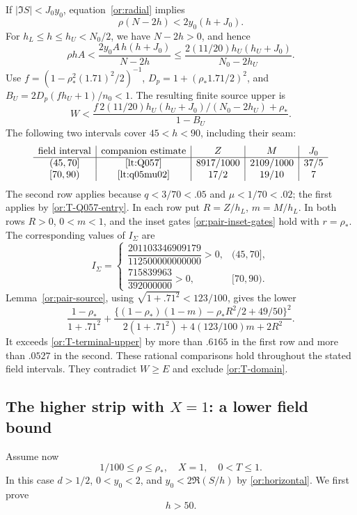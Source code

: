 If $|\Im S|<J_0y_0$, equation~\eqref{or:radial} implies
\[
                   \rho(N-2h)<2y_0(h+J_0).
\]
For $h_L\le h\le h_U<N_0/2$, we have $N-2h>0$, and hence
\[
 \rho hA<\frac{2y_0A\,h(h+J_0)}{N-2h}
       \le\frac{2(11/20)h_U(h_U+J_0)}{N_0-2h_U}.
\]
Use $f=(1-\rho_*^2(1.71)^2/2)^{-1}$,
$D_p=1+(\rho_*1.71/2)^2$, and
$B_U=2D_p(fh_U+1)/n_0<1$.  The resulting finite source upper is
\begin{equation}\label{or:T-terminal-upper}
 W<\frac{f\,2(11/20)h_U(h_U+J_0)/(N_0-2h_U)+\rho_*}{1-B_U}.
\end{equation}
The following two intervals cover $45<h<90$, including their seam:
\begin{equation}\label{or:T-terminal-table}
\begin{array}{c|c|c|c|c}
 \text{field interval}&\text{companion estimate}&Z&M&J_0\\ \hline
 (45,70]&\eqref{lt:Q057}&8917/1000&2109/1000&37/5\\
 {}[70,90)&\ref{lt:q05mu02}&17/2&19/10&7
\end{array}
\end{equation}
The second row applies because $q<3/70<.05$ and $\mu<1/70<.02$;
the first applies by \eqref{or:T-Q057-entry}.
In each row put $R=Z/h_L$, $m=M/h_L$.
In both rows $R>0$, $0<m<1$, and the inset gates
\eqref{or:pair-inset-gates} hold with $r=\rho_*$.
The corresponding values of $I_\Sigma$ are
\[
 I_\Sigma=
 \begin{cases}
  \dfrac{201103346909179}{112500000000000}>0,&(45,70],\\[3pt]
  \dfrac{715839963}{392000000}>0,&[70,90).
 \end{cases}
\]
Lemma~\ref{or:pair-source}, using
$\sqrt{1+.71^2}<123/100$, gives the lower
\begin{equation}\label{or:T-terminal-lower}
 \frac{1-\rho_*}{1+.71^2}+
 \frac{\{(1-\rho_*)(1-m)-\rho_*R^2/2+49/50\}^2}
 {2(1+.71^2)+4(123/100)m+2R^2}.
\end{equation}
It exceeds \eqref{or:T-terminal-upper} by more than $.6165$ in the
first row and more than $.0527$ in the second.  These rational
comparisons hold throughout the stated field intervals.
They contradict $W\ge E$ and exclude
\eqref{or:T-domain}.

\subsection{The higher strip with $X=1$: a lower field bound}

Assume now
\begin{equation}\label{or:X-domain}
             1/100\le\rho\le\rho_*,\quad X=1,\quad0<T\le1.
\end{equation}
In this case $d>1/2$, $0<y_0<2$, and
$y_0<2\Re(S/h)$ by \eqref{or:horizontal}.  We first prove
\begin{equation}\label{or:X-h50}
                                   h>50.
\end{equation}

